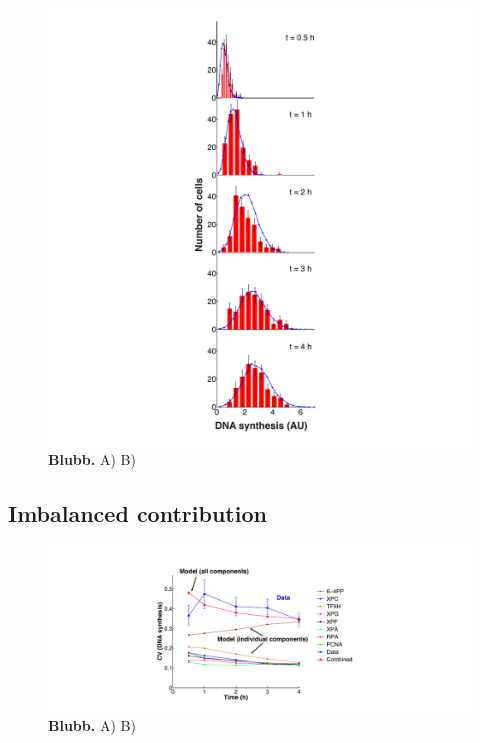 \begin{figure}[htbp]
	\begin{center}
		\includegraphics[width=1\textwidth]{Abbildungen/figure3_7.pdf}
		\caption{\textbf{Blubb.} A) B) }
		\label{fig:ModelData_tempVar}
	\end{center}
\end{figure}
\subsection{Imbalanced contribution }

\begin{figure}[htbp]
	\begin{center}
		\includegraphics[width=1\textwidth]{Abbildungen/figure3_8.pdf}
		\caption{\textbf{Blubb.} A) B) }
		\label{fig:CV_Var_comp}
	\end{center}
\end{figure}
